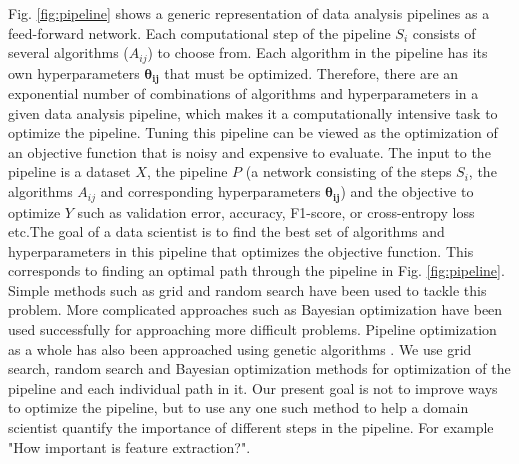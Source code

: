 Fig. \ref{fig:pipeline} shows a generic representation of data analysis pipelines as a feed-forward network. Each computational step of the pipeline $S_{i}$ consists of several algorithms ($A_{ij}$) to choose from. Each algorithm in the pipeline has its own hyperparameters $\bm{\theta_{ij}}$ that must be optimized. Therefore, there are an exponential number of combinations of algorithms and hyperparameters in a given data analysis pipeline, which makes it a  computationally intensive task to optimize the pipeline. Tuning this pipeline can be viewed as the optimization of an objective function that is noisy and expensive to evaluate. The input to the pipeline is a dataset $X$, the pipeline $P$ (a network consisting of the steps $S_{i}$, the algorithms $A_{ij}$ and corresponding hyperparameters $\bm{\theta_{ij}}$) and the objective to optimize $Y$ such as validation error, accuracy, F1-score, or cross-entropy loss etc.The goal of a data scientist is to find the best set of algorithms and hyperparameters in this pipeline that optimizes the objective function. This corresponds to finding an optimal path through the pipeline in Fig. \ref{fig:pipeline}.  Simple methods such as grid and random search \cite{bergstra2012random} have been used to tackle this problem. More complicated approaches such as Bayesian optimization \cite{snoek2012practical, zhang2016flash} have been used successfully for approaching more difficult problems. Pipeline optimization as a whole has also been approached using genetic algorithms \cite{olson2016evaluation, olson2016tpot}.
We use grid search, random search and Bayesian optimization methods for optimization of the pipeline and each individual path in it. Our present goal is not to improve ways to optimize the pipeline, but to use any one such method to help a domain scientist quantify the importance of different steps in the pipeline. For example "How important is feature extraction?".

